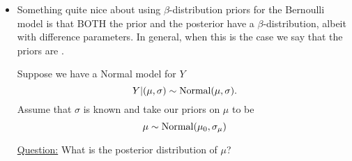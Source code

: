 \begin{itemize}
\item Something quite nice about using $\beta$-distribution priors for the Bernoulli model is that BOTH the prior and the posterior have a $\beta$-distribution, albeit with difference parameters. In general, when this is the case we say that the priors are . 




\begin{example}\label{ex:normal}

Suppose we have a Normal model for $Y$
\begin{equation*}
Y|(\mu,\sigma) \sim {\rm Normal}(\mu,\sigma).
\end{equation*}
Assume that $\sigma$ is known and take our priors on $\mu$ to be 
\begin{equation*}
\mu \sim {\rm Normal}(\mu_0,\sigma_{\mu})\\
\end{equation*}


\noindent
\underline{Question:} What is the posterior distribution of $\mu$? \\



\end{example}
\end{itemize}
